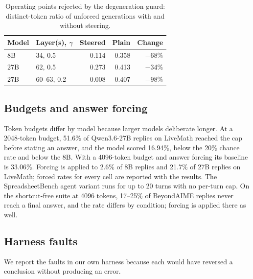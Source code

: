 \documentclass[11pt]{article}
\begin{document}
\begin{table}[t]
\centering\small
\begin{tabular}{@{}llrrr@{}}
\toprule
Model & Layer(s), $\gamma$ & Steered & Plain & Change \\
\midrule
8B & 34, 0.5 & 0.114 & 0.358 & $-68\%$ \\
27B & 62, 0.5 & 0.273 & 0.413 & $-34\%$ \\
27B & 60--63, 0.2 & 0.008 & 0.407 & $-98\%$ \\
\bottomrule
\end{tabular}
\caption{Operating points rejected by the degeneration guard: distinct-token ratio of unforced
generations with and without steering.}
\label{tab:degen}
\end{table}

\subsection{Budgets and answer forcing}
\label{app:budget}

Token budgets differ by model because larger models deliberate longer. At a 2048-token budget, 51.6\%
of Qwen3.6-27B replies on LiveMath reached the cap before stating an answer, and the model scored
16.94\%, below the 20\% chance rate and below the 8B. With a 4096-token budget and answer forcing its
baseline is 33.06\%. Forcing is applied to 2.6\% of 8B replies and 21.7\% of 27B replies on
LiveMath; forced rates for every cell are reported with the results. The SpreadsheetBench agent
variant runs for up to 20 turns with no per-turn cap. On the shortcut-free suite at 4096 tokens,
17--25\% of BeyondAIME replies never reach a final answer, and the rate differs by condition; forcing
is applied there as well.

\subsection{Harness faults}
\label{app:faults}

We report the faults in our own harness because each would have reversed a conclusion without
producing an error.
\end{document}
